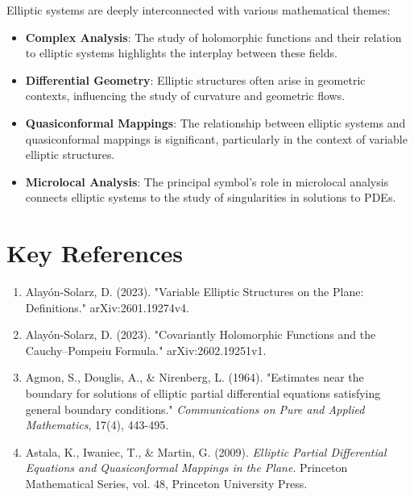 \documentclass[11pt,a4paper]{article}
\begin{document}
Elliptic systems are deeply interconnected with various mathematical themes:

\begin{itemize}
\item \textbf{Complex Analysis}: The study of holomorphic functions and their relation to elliptic systems highlights the interplay between these fields.
\end{itemize}

\begin{itemize}
\item \textbf{Differential Geometry}: Elliptic structures often arise in geometric contexts, influencing the study of curvature and geometric flows.
\end{itemize}

\begin{itemize}
\item \textbf{Quasiconformal Mappings}: The relationship between elliptic systems and quasiconformal mappings is significant, particularly in the context of variable elliptic structures.
\end{itemize}

\begin{itemize}
\item \textbf{Microlocal Analysis}: The principal symbol's role in microlocal analysis connects elliptic systems to the study of singularities in solutions to PDEs.
\end{itemize}

\section{Key References}

\begin{enumerate}
\item Alayón-Solarz, D. (2023). "Variable Elliptic Structures on the Plane: Definitions." arXiv:2601.19274v4.
\item Alayón-Solarz, D. (2023). "Covariantly Holomorphic Functions and the Cauchy--Pompeiu Formula." arXiv:2602.19251v1.
\item Agmon, S., Douglis, A., & Nirenberg, L. (1964). "Estimates near the boundary for solutions of elliptic partial differential equations satisfying general boundary conditions." \textit{Communications on Pure and Applied Mathematics}, 17(4), 443-495.
\item Astala, K., Iwaniec, T., & Martin, G. (2009). \textit{Elliptic Partial Differential Equations and Quasiconformal Mappings in the Plane}. Princeton Mathematical Series, vol. 48, Princeton University Press.
\end{enumerate}
\end{document}

